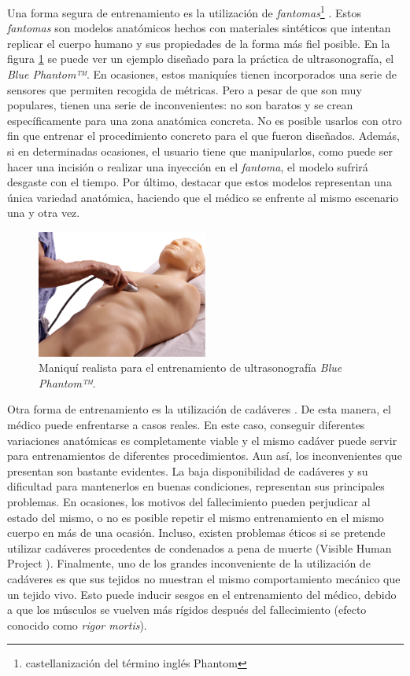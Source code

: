 Una forma segura de entrenamiento es la utilización de \emph{fantomas}\footnote{castellanización del término inglés Phantom} \cite{phantomra}. 
Estos \emph{fantomas} son modelos anatómicos hechos con materiales sintéticos que intentan replicar el cuerpo humano y sus propiedades de la forma más fiel posible. En la figura \ref{fig:phantom} se puede ver un ejemplo diseñado para la práctica de ultrasonografía, el \emph{Blue Phantom™}\cite{BluePH}. En ocasiones, estos maniquíes tienen incorporados una serie de sensores que permiten recogida de métricas. Pero a pesar de que son muy populares, tienen una serie de inconvenientes: no son baratos y se crean específicamente para una zona anatómica concreta. No es posible usarlos con otro fin que entrenar el procedimiento concreto para el que fueron diseñados. Además, si en determinadas ocasiones, el usuario tiene que manipularlos, como puede ser hacer una incisión o realizar una inyección en el \emph{fantoma}, el modelo sufrirá desgaste con el tiempo. Por último, destacar que estos modelos representan una única variedad anatómica, haciendo que el médico se enfrente al mismo escenario una y otra vez.
\begin{figure}[h]
   \centering
    \includegraphics[width=0.5\textwidth]{IMG/fast_trauma.jpg}
    \caption{Maniquí realista para el entrenamiento de ultrasonografía  \emph{Blue Phantom™}\cite{BluePH}. }
   \label{fig:phantom}
\end{figure}

Otra forma de entrenamiento es la utilización de cadáveres \cite{Tsui2007}. De esta manera, el médico puede enfrentarse a casos reales. En este caso, conseguir diferentes variaciones anatómicas es completamente viable y el mismo cadáver puede servir para entrenamientos de diferentes procedimientos. Aun así, los inconvenientes que presentan son bastante evidentes. 
La baja disponibilidad de cadáveres y su dificultad para mantenerlos en buenas condiciones, representan sus principales problemas. En ocasiones, los motivos del fallecimiento pueden perjudicar al estado del mismo, o no es posible repetir el mismo entrenamiento en el mismo cuerpo en más de una ocasión. Incluso, existen problemas éticos si se pretende utilizar cadáveres procedentes de condenados a pena de muerte (Visible Human Project \cite{ackerman1998visible}).
Finalmente, uno de los grandes inconveniente de la utilización de cadáveres es que sus tejidos no muestran el mismo comportamiento mecánico que un tejido vivo. Esto puede inducir sesgos en el entrenamiento del médico, debido a que los músculos se vuelven más rígidos después del fallecimiento (efecto conocido como \emph{rigor mortis}).

